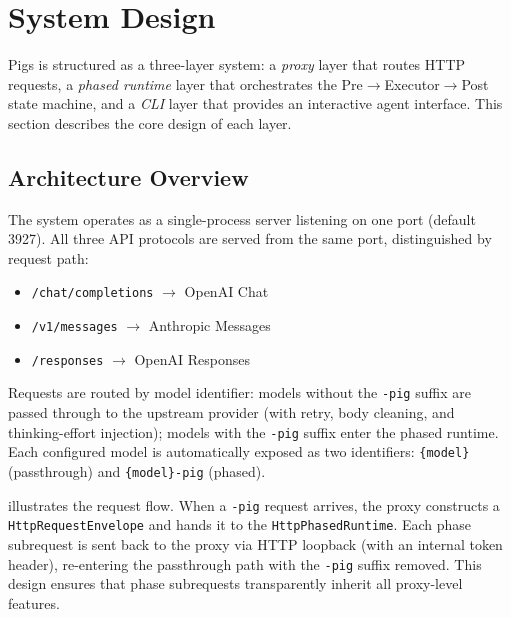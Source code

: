 \section{System Design}
\label{sec:design}

Pigs is structured as a three-layer system: a \emph{proxy} layer that routes HTTP requests, a \emph{phased runtime} layer that orchestrates the Pre$\rightarrow$Executor$\rightarrow$Post state machine, and a \emph{CLI} layer that provides an interactive agent interface. This section describes the core design of each layer.

\subsection{Architecture Overview}
\label{sec:overview}

The system operates as a single-process server listening on one port (default 3927). All three API protocols are served from the same port, distinguished by request path:

\begin{itemize}[nosep]
    \item \texttt{/chat/completions} $\rightarrow$ OpenAI Chat
    \item \texttt{/v1/messages} $\rightarrow$ Anthropic Messages
    \item \texttt{/responses} $\rightarrow$ OpenAI Responses
\end{itemize}

Requests are routed by model identifier: models without the \texttt{-pig} suffix are passed through to the upstream provider (with retry, body cleaning, and thinking-effort injection); models with the \texttt{-pig} suffix enter the phased runtime. Each configured model is automatically exposed as two identifiers: \texttt{\{model\}} (passthrough) and \texttt{\{model\}-pig} (phased).

 illustrates the request flow. When a \texttt{-pig} request arrives, the proxy constructs a \texttt{HttpRequestEnvelope} and hands it to the \texttt{HttpPhasedRuntime}. Each phase subrequest is sent back to the proxy via HTTP loopback (with an internal token header), re-entering the passthrough path with the \texttt{-pig} suffix removed. This design ensures that phase subrequests transparently inherit all proxy-level features.

